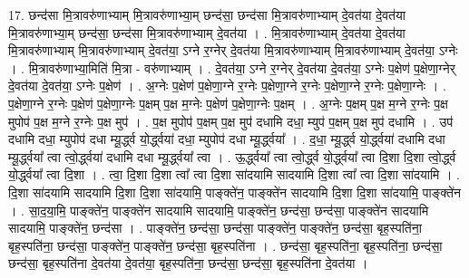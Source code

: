 \documentclass[17pt]{extarticle}
\begin{document}
17. छन्द॑सा मि॒त्रावरु॑णाभ्याम् मि॒त्रावरु॑णाभ्या॒म् छन्द॑सा॒ छन्द॑सा मि॒त्रावरु॑णाभ्याम् दे॒वत॑या दे॒वत॑या मि॒त्रावरु॑णाभ्या॒म् छन्द॑सा॒ छन्द॑सा मि॒त्रावरु॑णाभ्याम् दे॒वत॑या । . मि॒त्रावरु॑णाभ्याम् दे॒वत॑या दे॒वत॑या मि॒त्रावरु॑णाभ्याम् मि॒त्रावरु॑णाभ्याम् दे॒वत॑या॒ ऽग्ने र॒ग्नेर् दे॒वत॑या मि॒त्रावरु॑णाभ्याम् मि॒त्रावरु॑णाभ्याम् दे॒वत॑या॒ ऽग्नेः । . मि॒त्रावरु॑णाभ्या॒मिति॑ मि॒त्रा - वरु॑णाभ्याम् । . दे॒वत॑या॒ ऽग्ने र॒ग्नेर् दे॒वत॑या दे॒वत॑या॒ ऽग्नेः प॒क्षेण॑ प॒क्षेणा॒ग्नेर् दे॒वत॑या दे॒वत॑या॒ ऽग्नेः प॒क्षेण॑ । . अ॒ग्नेः प॒क्षेण॑ प॒क्षेणा॒ग्ने र॒ग्नेः प॒क्षेणा॒ग्ने र॒ग्नेः प॒क्षेणा॒ग्ने र॒ग्नेः प॒क्षेणा॒ग्नेः । . प॒क्षेणा॒ग्ने र॒ग्नेः प॒क्षेण॑ प॒क्षेणा॒ग्नेः प॒क्षम् प॒क्ष म॒ग्नेः प॒क्षेण॑ प॒क्षेणा॒ग्नेः प॒क्षम् । . अ॒ग्नेः प॒क्षम् प॒क्ष म॒ग्ने र॒ग्नेः प॒क्ष मुपोप॑ प॒क्ष म॒ग्ने र॒ग्नेः प॒क्ष मुप॑ । . प॒क्ष मुपोप॑ प॒क्षम् प॒क्ष मुप॑ दधामि दधा॒ म्युप॑ प॒क्षम् प॒क्ष मुप॑ दधामि । . उप॑ दधामि दधा॒ म्युपोप॑ दधा म्यू॒र्द्ध्व यो॒र्द्ध्वया॑ दधा॒ म्युपोप॑ दधा म्यू॒र्द्ध्वया᳚ । . द॒धा॒ म्यू॒र्द्ध्व यो॒र्द्ध्वया॑ दधामि दधा म्यू॒र्द्ध्वया᳚ त्वा त्वो॒र्द्ध्वया॑ दधामि दधा म्यू॒र्द्ध्वया᳚ त्वा । . ऊ॒र्द्ध्वया᳚ त्वा त्वो॒र्द्ध्व यो॒र्द्ध्वया᳚ त्वा दि॒शा दि॒शा त्वो॒र्द्ध्व यो॒र्द्ध्वया᳚ त्वा दि॒शा । . त्वा॒ दि॒शा दि॒शा त्वा᳚ त्वा दि॒शा सा॑दयामि सादयामि दि॒शा त्वा᳚ त्वा दि॒शा सा॑दयामि । . दि॒शा सा॑दयामि सादयामि दि॒शा दि॒शा सा॑दयामि॒ पाङ्क्ते॑न॒ पाङ्क्ते॑न सादयामि दि॒शा दि॒शा सा॑दयामि॒ पाङ्क्ते॑न । . सा॒द॒या॒मि॒ पाङ्क्ते॑न॒ पाङ्क्ते॑न सादयामि सादयामि॒ पाङ्क्ते॑न॒ छन्द॑सा॒ छन्द॑सा॒ पाङ्क्ते॑न सादयामि सादयामि॒ पाङ्क्ते॑न॒ छन्द॑सा । . पाङ्क्ते॑न॒ छन्द॑सा॒ छन्द॑सा॒ पाङ्क्ते॑न॒ पाङ्क्ते॑न॒ छन्द॑सा॒ बृह॒स्पति॑ना॒ बृह॒स्पति॑ना॒ छन्द॑सा॒ पाङ्क्ते॑न॒ पाङ्क्ते॑न॒ छन्द॑सा॒ बृह॒स्पति॑ना । . छन्द॑सा॒ बृह॒स्पति॑ना॒ बृह॒स्पति॑ना॒ छन्द॑सा॒ छन्द॑सा॒ बृह॒स्पति॑ना दे॒वत॑या दे॒वत॑या॒ बृह॒स्पति॑ना॒ छन्द॑सा॒ छन्द॑सा॒ बृह॒स्पति॑ना दे॒वत॑या । \newline
\end{document}

